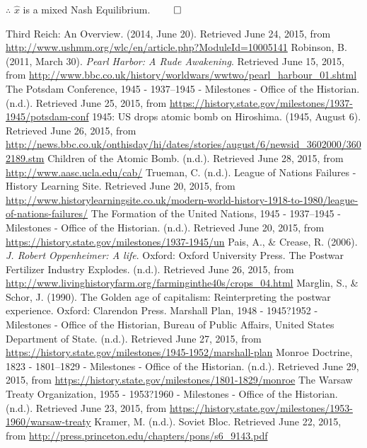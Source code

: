 \documentclass[12pt]{article}
\begin{document}
$\therefore$ $\hat{x}$ is a mixed Nash Equilibrium.
$\qed$


\newpage
\begin{thebibliography}{10}
 Third Reich: An Overview. (2014, June 20). Retrieved June 24, 2015, from \url{http://www.ushmm.org/wlc/en/article.php?ModuleId=10005141}
 Robinson, B. (2011, March 30). \textit{Pearl Harbor: A Rude Awakening}. Retrieved June 15, 2015, from \url{http://www.bbc.co.uk/history/worldwars/wwtwo/pearl_harbour_01.shtml}
 The Potsdam Conference, 1945 - 1937–1945 - Milestones - Office of the Historian. (n.d.). Retrieved June 25, 2015, from \url{https://history.state.gov/milestones/1937-1945/potsdam-conf}
 1945: US drops atomic bomb on Hiroshima. (1945, August 6). Retrieved June 26, 2015, from \url{http://news.bbc.co.uk/onthisday/hi/dates/stories/august/6/newsid_3602000/3602189.stm}
 Children of the Atomic Bomb. (n.d.). Retrieved June 28, 2015, from \url{http://www.aasc.ucla.edu/cab/}
 Trueman, C. (n.d.). League of Nations Failures - History Learning Site. Retrieved June 20, 2015, from \url{http://www.historylearningsite.co.uk/modern-world-history-1918-to-1980/league-of-nations-failures/}
 The Formation of the United Nations, 1945 - 1937–1945 - Milestones - Office of the Historian. (n.d.). Retrieved June 20, 2015, from \url{https://history.state.gov/milestones/1937-1945/un}
 Pais, A., \& Crease, R. (2006). \textit{J. Robert Oppenheimer: A life}. Oxford: Oxford University Press. 
 The Postwar Fertilizer Industry Explodes. (n.d.). Retrieved June 26, 2015, from \url{http://www.livinghistoryfarm.org/farminginthe40s/crops\_04.html}
 Marglin, S., \& Schor, J. (1990). The Golden age of capitalism: Reinterpreting the postwar experience. Oxford: Clarendon Press.
 Marshall Plan, 1948 - 1945?1952 - Milestones - Office of the Historian, Bureau of Public Affairs, United States Department of State. (n.d.). Retrieved June 27, 2015, from \url{https://history.state.gov/milestones/1945-1952/marshall-plan}
 Monroe Doctrine, 1823 - 1801–1829 - Milestones - Office of the Historian. (n.d.). Retrieved June 29, 2015, from \url{https://history.state.gov/milestones/1801-1829/monroe}
 The Warsaw Treaty Organization, 1955 - 1953?1960 - Milestones - Office of the Historian. (n.d.). Retrieved June 23, 2015, from \url{https://history.state.gov/milestones/1953-1960/warsaw-treaty}
 Kramer, M. (n.d.). Soviet Bloc. Retrieved June 22, 2015, from \url{http://press.princeton.edu/chapters/pons/s6\_9143.pdf}

\end{thebibliography}
\end{document}
